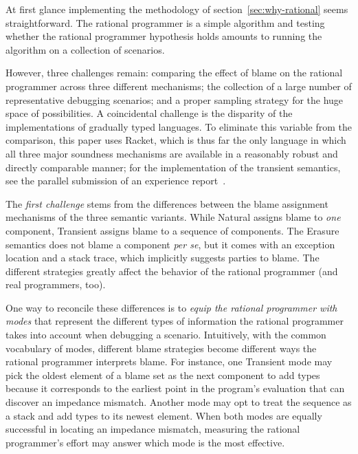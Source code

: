 
At first glance implementing the methodology of
section~\ref{sec:why-rational} seems straightforward. The rational
programmer is a simple algorithm and testing whether the rational
programmer hypothesis holds amounts to running the algorithm on a
collection of scenarios. 

However, three challenges remain:  comparing the effect of
blame on the rational programmer across three different mechanisms; the
collection of a large number of representative debugging scenarios;  and a
proper sampling strategy for the huge space of possibilities. A
coincidental challenge is the disparity of the implementations of
gradually typed languages. To eliminate this variable from the comparison,
this paper uses Racket, which is thus far the only language in which all
three major soundness mechanisms are available in a reasonably robust and
directly comparable manner; for the implementation of the transient
semantics, see the parallel submission of an experience
report~\cite{ttt21}.

The {\em first challenge\/} stems from the differences between the blame
assignment mechanisms of the three semantic variants.  While Natural
assigns blame to {\em one\/} component, Transient assigns blame to a
sequence of components. The Erasure semantics does not blame a component
{\it per se\/}, but it comes with an exception location and a stack trace,
which implicitly suggests parties to blame.  The different strategies
greatly affect the behavior of the rational programmer (and real
programmers, too).

One way to reconcile these differences is to {\em equip the rational
programmer with modes \/} that represent the different types of
information the rational programmer takes into account when debugging a
scenario. Intuitively, with the common vocabulary of modes, different
blame strategies become different ways the rational programmer  interprets
blame.  For instance, one Transient mode may pick the oldest element of a
blame set as the next component to add types because it corresponds to the
earliest point in the program's evaluation that can discover an impedance
mismatch.  Another mode may opt to treat the sequence as a stack and add
types to its newest element.  When both modes are equally successful in
locating an impedance mismatch, measuring the rational programmer's effort
may answer which mode is the most effective.


